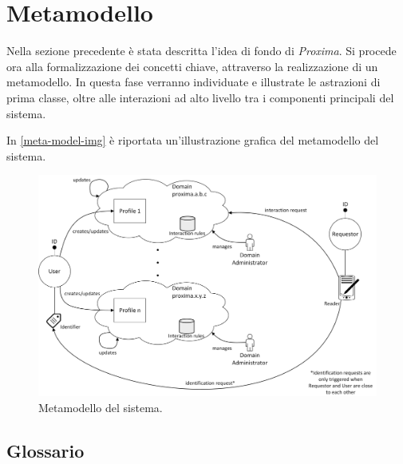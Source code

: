\documentclass[a4paper,12pt]{report}
\begin{document}
\section{Metamodello} \label{meta-model}

Nella sezione precedente è stata descritta l'idea di fondo di \emph{Proxima}. Si procede ora alla formalizzazione dei concetti chiave, attraverso la realizzazione di un metamodello. In questa fase verranno individuate e illustrate le astrazioni di prima classe, oltre alle interazioni ad alto livello tra i componenti principali del sistema. 

In \autoref{meta-model-img} è riportata un'illustrazione grafica del metamodello del sistema.

\begin{figure}[H]
	\hspace*{-0.7in}
	\centering
	\includegraphics[width=160mm]{./img/meta_model.png}
	\caption{Metamodello del sistema. \label{meta-model-img}}
\end{figure}

\subsection{Glossario}
\end{document}

